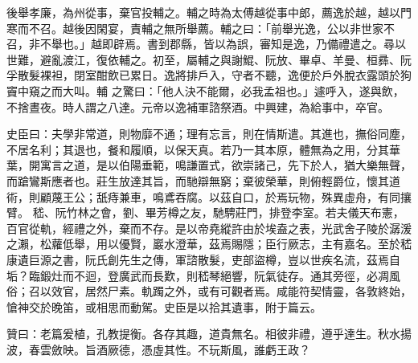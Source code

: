 \begin{pinyinscope}
 後舉孝廉，為州從事，棄官投輔之。輔之時為太傅越從事中郎，薦逸於越，越以門寒而不召。越後因閑宴，責輔之無所舉薦。輔之曰：「前舉光逸，公以非世家不召，非不舉也。」越即辟焉。書到郡縣，皆以為誤，審知是逸，乃備禮遣之。尋以世難，避亂渡江，復依輔之。初至，屬輔之與謝鯤、阮放、畢卓、羊曼、桓彞、阮孚散髮裸袒，閉室酣飲已累日。逸將排戶入，守者不聽，逸便於戶外脫衣露頭於狗竇中窺之而大叫。輔
 之驚曰：「他人決不能爾，必我孟祖也。」遽呼入，遂與飲，不捨晝夜。時人謂之八達。元帝以逸補軍諮祭酒。中興建，為給事中，卒官。



 史臣曰：夫學非常道，則物靡不通；理有忘言，則在情斯遣。其進也，撫俗同塵，不居名利；其退也，餐和履順，以保天真。若乃一其本原，體無為之用，分其華葉，開寓言之道，是以伯陽垂範，鳴謙置式，欲崇諸己，先下於人，猶大樂無聲，而蹌鸞斯應者也。莊生放達其旨，而馳辯無窮；棄彼榮華，則俯輕爵位，懷其道術，則顧蔑王公；舐痔兼車，鳴鳶吞腐。以茲自口，於焉玩物，殊異虛舟，有同攘臂。
 嵇、阮竹林之會，劉、畢芳樽之友，馳騁莊門，排登李室。若夫儀天布憲，百官從軌，經禮之外，棄而不存。是以帝堯縱許由於埃盍之表，光武舍子陵於潺湲之瀨，松蘿低舉，用以優賢，巖水澄華，茲焉賜隱；臣行厥志，主有嘉名。至於嵇康遺巨源之書，阮氏創先生之傳，軍諮散髮，吏部盜樽，豈以世疾名流，茲焉自垢？臨鍛灶而不迴，登廣武而長歎，則嵇琴絕響，阮氣徒存。通其旁徑，必凋風俗；召以效官，居然尸素。軌躅之外，或有可觀者焉。咸能符契情靈，各敦終始，愴神交於晚笛，或相思而動駕。史臣是以拾其遺事，附于篇云。



 贊曰：老篇爰植，孔教提衡。各存其趣，道貴無名。相彼非禮，遵乎達生。秋水揚波，春雲斂映。旨酒厥德，憑虛其性。不玩斯風，誰虧王政？



\end{pinyinscope}